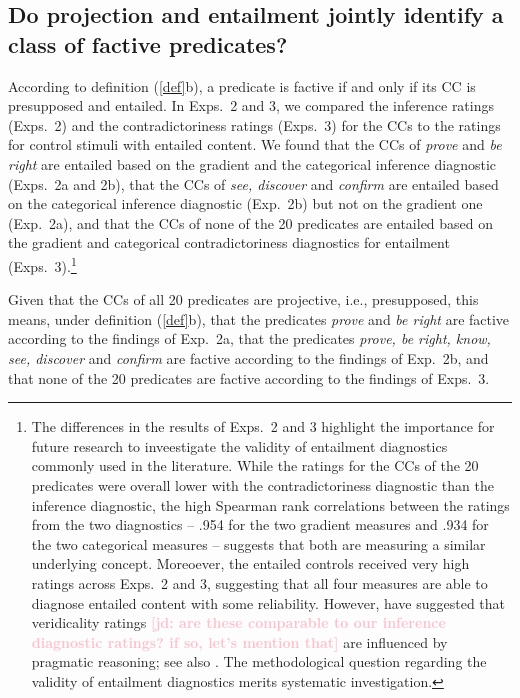 \documentclass[11pt,fleqn]{article}
\newcommand{\jd}[1]{\textbf{\textcolor{Pink}{[jd: #1]}}}
\newcommand{\6}{\mbox{$[\hspace*{-.6mm}[$}}
\newcommand{\9}{\mbox{$]\hspace*{-.6mm}]$}}
\begin{document}
{\subsection{Do projection and entailment jointly identify a class of factive predicates?}\label{s33}

According to definition (\ref{def}b), a predicate is factive if and only if its CC is presupposed and entailed. In Exps.~2 and 3, we compared the inference ratings (Exps.~2) and the contradictoriness ratings (Exps.~3) for the CCs to the ratings for control stimuli with entailed content. We found that the CCs of {\em prove} and {\em be right} are entailed based on the gradient and the categorical inference diagnostic (Exps.~2a and 2b), that the CCs of {\em see, discover} and {\em confirm} are entailed based on the categorical inference diagnostic (Exp.~2b) but not on the gradient one (Exp.~2a), and that the CCs of none of the 20 predicates are entailed based on the gradient and categorical contradictoriness diagnostics for entailment (Exps.~3).\footnote{The differences in the results of Exps.~2 and 3 highlight the importance for future research to inveestigate the validity of entailment diagnostics commonly used in the literature. While the ratings for the CCs of the 20 predicates were overall lower with the  contradictoriness diagnostic than the inference diagnostic, the high Spearman rank correlations between the ratings from the two diagnostics -- .954 for the two gradient measures and .934 for the two categorical measures -- suggests that both are measuring a similar underlying concept. Moreoever, the entailed controls received very high ratings across Exps.~2 and 3, suggesting that all four measures are able to diagnose entailed content with some reliability.   However, \citet[329]{demarneffe-etal2012} have suggested that veridicality ratings \jd{are these comparable to our inference diagnostic ratings? if so, let's mention that} are influenced by pragmatic reasoning; see also \citealt{pavlick-kwiatkowski2019}. The methodological question regarding the validity of entailment diagnostics merits systematic investigation.}} Given that the CCs of all 20 predicates are projective, i.e., presupposed, this means, under definition (\ref{def}b), that the predicates {\em prove} and {\em be right} are factive according to the findings of Exp.~2a, that the predicates {\em prove, be right, know, see, discover} and {\em confirm} are factive according to the findings of Exp.~2b, and that none of the 20 predicates are factive according to the findings of Exps.~3.  
\end{document}
